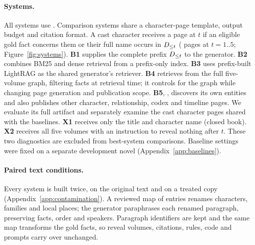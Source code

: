 \paragraph{Systems.}
All systems use . Comparison systems share a character-page template,
output budget and citation format. A cast character receives a page at $t$ if an eligible
gold fact concerns them or their full name occurs in $D_{\le t}$
( pages at $t=1..5$; Figure~\ref{fig:systems}).
\textbf{B1} supplies the complete prefix $D_{\le t}$ to the generator.
\textbf{B2} combines BM25 and dense retrieval from a prefix-only index.
\textbf{B3} uses prefix-built LightRAG \citep{guo2024lightrag} as the shared generator's retriever.
\textbf{B4} retrieves from the full five-volume \sys graph, filtering facts at retrieval time;
it controls for the graph while changing page generation and publication scope.
\textbf{B5}, \sys, discovers its own entities and also publishes other character,
relationship, codex and timeline pages. We evaluate its full artifact and separately examine
the cast character pages shared with the baselines.
\textbf{X1} receives only the title and character name (closed book).
\textbf{X2} receives all five volumes with an instruction to reveal nothing after $t$.
These two diagnostics are excluded from best-system comparisons. Baseline settings were
fixed on a separate development novel (Appendix~\ref{app:baselines}).

\ifdefined\nwvtwo
\paragraph{Paired text conditions.}
Every system is built twice, on the original text and on a treated copy
(Appendix~\ref{app:contamination}). A reviewed map of  entries renames
characters, families and local places; the generator paraphrases each renamed
paragraph, preserving facts, order and speakers. Paragraph identifiers are kept and the
same map transforms the gold facts, so reveal volumes, citations, rules, code and
prompts carry over unchanged.

\fi
